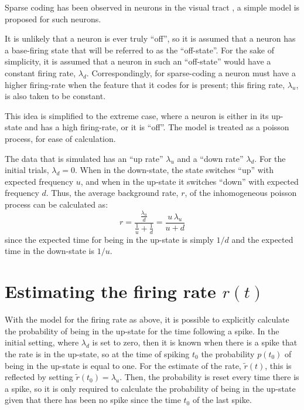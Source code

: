 Sparse coding has been observed in neurons in the visual tract \cite{OlshausenField2004}, a simple model is proposed for such neurons.

It is unlikely that a neuron is ever truly ``off'', so it is assumed that a neuron has a base-firing state that will be referred to as the ``off-state''.  For the sake of simplicity, it is assumed that a neuron in such an ``off-state'' would have a constant firing rate, $\lambda_d$.  Correspondingly, for sparse-coding a neuron must have a higher firing-rate when the feature that it codes for is present; this firing rate, $\lambda_u$, is also taken to be constant.


This idea is simplified to the extreme case, where a neuron is either in its up-state and has a high firing-rate, or it is ``off''.   The model is treated as a poisson process, for ease of calculation.

The data that is simulated has an ``up rate'' $\lambda_u$ and a ``down rate'' $\lambda_d$.  For the initial trials, $\lambda_d = 0$.  When in the down-state, the state switches ``up'' with expected frequency $u$, and when in the up-state it switches ``down'' with expected frequency $d$.  Thus, the average background rate, $r$, of the inhomogeneous poisson process can be calculated as:
\begin{equation}\label{lam}
r = \frac{ \frac{\lambda_u }{d}}{ \frac{1}{u} + \frac{1}{d}} = \frac{u\, \lambda_u}{u+d}
\end{equation}
since the expected time for being in the up-state is simply $1/d$ and the expected time in the down-state is $1/u$.


\section{Estimating the firing rate $r(t)$}

With the model for the firing rate as above, it is possible to explicitly calculate the probability of being in the up-state for the time following a spike.  In the initial setting, where $\lambda_d$ is set to zero, then it is known when there is a spike that the rate is in the up-state, so at the time of spiking $t_0$ the probability $p(t_0)$ of being in the up-state is equal to one.  For the estimate of the rate, $\tilde{r}(t)$, this is reflected by setting $\tilde{r}(t_0) = \lambda_u$.  Then, the probability is reset every time there is a spike, so it is only required to calculate the probability of being in the up-state given that there has been no spike since the time $t_0$ of the last spike.  

